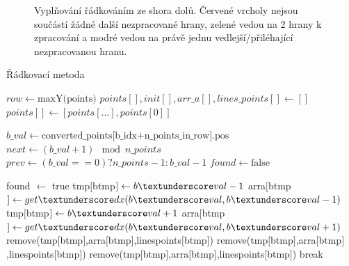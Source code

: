 \documentclass[a4paper,12pt]{report}
\begin{document}
\begin{figure}[H]
  \centering
  
  \caption{Vyplňování řádkováním ze shora dolů. Červené vrcholy nejsou součástí žádné další nezpracované hrany, zelené vedou na 2 hrany k zpracování a modré vedou na právě jednu vedlejší/přiléhající nezpracovanou hranu.}
\end{figure}



\begin{algorithm}[H]
\caption{Řádkovací metoda}
\label{alg:radkovani}
\begin{algorithmic}

\State $row \gets \text{maxY(points)}$
\State $points[], init[],arr\_a[],lines\_points[] \gets []$
\State $points[] \gets [points[...],points[0]]$

\State $b\_val \gets \text{converted\_points[b\_idx+n\_points\_in\_row].pos}$
\State $next \gets (b\_val+1) \mod n\_points$
\State $prev \gets (b\_val==0) ? n\_points-1 : b\_val-1$
\State $found \gets \text{false}$ 
   
\State found $\gets$ true
\State tmp$[$b\textunderscore tmp$] \gets b\textunderscore val-1$
\State arr\textunderscore a$[$b\textunderscore tmp$] \gets get\textunderscore dx(b\textunderscore val,b\textunderscore val-1)$
\State tmp$[$b\textunderscore tmp$] \gets b\textunderscore val+1$
\State arr\textunderscore a$[$b\textunderscore tmp$] \gets get\textunderscore dx(b\textunderscore val,b\textunderscore val+1)$
\State remove(tmp$[$b\textunderscore tmp$]$,arr\textunderscore a$[$b\textunderscore tmp$]$,lines\textunderscore points$[$b\textunderscore tmp$]$)
\Else
\State remove(tmp$[$b\textunderscore tmp$]$,arr\textunderscore a$[$b\textunderscore tmp$]$,lines\textunderscore points$[$b\textunderscore tmp$]$)
\State remove(tmp$[$b\textunderscore tmp$]$,arr\textunderscore a$[$b\textunderscore tmp$]$,lines\textunderscore points$[$b\textunderscore tmp$]$)
\EndIf
\State break
\EndIf
\EndFor



\end{algorithmic}
\end{algorithm}
\end{document}

